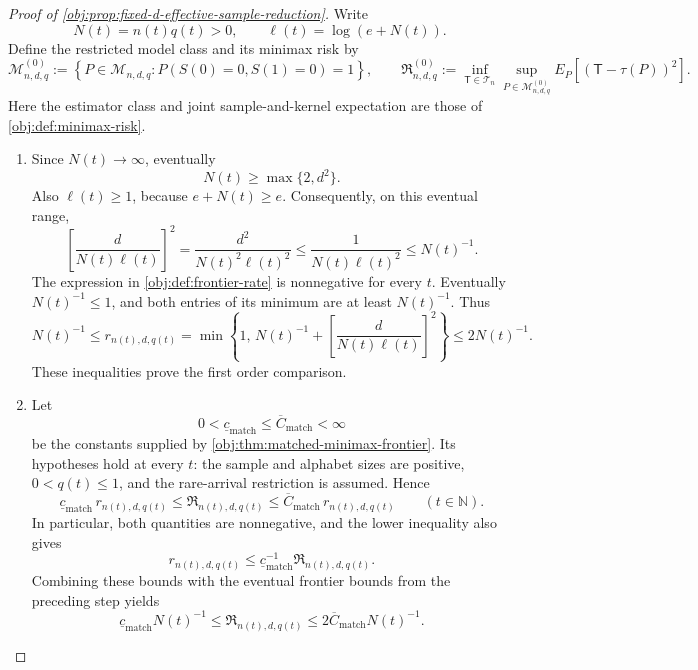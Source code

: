 \begin{proof}[Proof of \cref{obj:prop:fixed-d-effective-sample-reduction}]
Write
\[
N(t)=n(t)q(t)>0,
\qquad
\ell(t)=\log(e+N(t)).
\]
Define the restricted model class and its minimax risk by
\[
\mathcal M^{(0)}_{n,d,q}
:=
\left\{
P\in\mathcal M_{n,d,q}:
P(S(0)=0,S(1)=0)=1
\right\},
\qquad
\mathfrak R^{(0)}_{n,d,q}
:=
\inf_{\mathsf T\in\mathcal T_n}
\sup_{P\in\mathcal M^{(0)}_{n,d,q}}
E_P[(\mathsf T-\tau(P))^2].
\]
Here the estimator class and joint sample-and-kernel expectation are those of
\cref{obj:def:minimax-risk}.

\begin{enumerate}
\item Since \(N(t)\to\infty\), eventually
\[
N(t)\ge \max\{2,d^2\}.
\]
Also \(\ell(t)\ge1\), because \(e+N(t)\ge e\). Consequently, on this eventual range,
\[
\left[\frac{d}{N(t)\ell(t)}\right]^2
=
\frac{d^2}{N(t)^2\ell(t)^2}
\le
\frac{1}{N(t)\ell(t)^2}
\le
N(t)^{-1}.
\]
The expression in \cref{obj:def:frontier-rate} is nonnegative for every \(t\).
Eventually \(N(t)^{-1}\le1\), and both entries of its minimum are at least
\(N(t)^{-1}\). Thus
\[
N(t)^{-1}
\le
r_{n(t),d,q(t)}
=
\min\left\{
1,\,
N(t)^{-1}+
\left[\frac{d}{N(t)\ell(t)}\right]^2
\right\}
\le
2N(t)^{-1}.
\]
These inequalities prove the first order comparison.

\item Let
\[
0<\underline c_{\mathrm{match}}
\le \overline C_{\mathrm{match}}<\infty
\]
be the constants supplied by \cref{obj:thm:matched-minimax-frontier}.
Its hypotheses hold at every \(t\): the sample and alphabet sizes are positive,
\(0<q(t)\le1\), and the rare-arrival restriction is assumed. Hence
\[
\underline c_{\mathrm{match}}\,r_{n(t),d,q(t)}
\le
\mathfrak R_{n(t),d,q(t)}
\le
\overline C_{\mathrm{match}}\,r_{n(t),d,q(t)}
\qquad(t\in\mathbb N).
\]
In particular, both quantities are nonnegative, and the lower inequality also gives
\[
r_{n(t),d,q(t)}
\le
\underline c_{\mathrm{match}}^{-1}
\mathfrak R_{n(t),d,q(t)}.
\]
Combining these bounds with the eventual frontier bounds from the preceding step yields
\[
\underline c_{\mathrm{match}}N(t)^{-1}
\le
\mathfrak R_{n(t),d,q(t)}
\le
2\overline C_{\mathrm{match}}N(t)^{-1}.
\]


\end{enumerate}
\end{proof}
